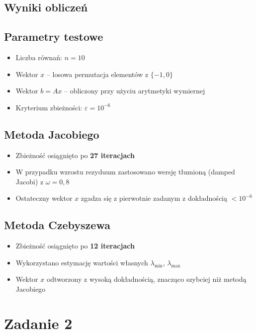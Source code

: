 \documentclass[a4paper,12pt]{article}
\begin{document}
\newpage
\subsection*{Wyniki obliczeń}

\subsection*{Parametry testowe}
\begin{itemize}
  \item Liczba równań: \( n = 10 \)
  \item Wektor \( x \) – losowa permutacja elementów z \( \{-1, 0\} \)
  \item Wektor \( b = A x \) – obliczony przy użyciu arytmetyki wymiernej
  \item Kryterium zbieżności: \( \varepsilon = 10^{-6} \)
\end{itemize}

\subsection*{Metoda Jacobiego}
\begin{itemize}
  \item Zbieżność osiągnięto po \textbf{27 iteracjach}
  \item W przypadku wzrostu rezyduum zastosowano wersję tłumioną (damped Jacobi) z \( \omega = 0{,}8 \)
  \item Ostateczny wektor \( x \) zgadza się z pierwotnie zadanym z dokładnością \( < 10^{-6} \)
\end{itemize}

\subsection*{Metoda Czebyszewa}
\begin{itemize}
  \item Zbieżność osiągnięto po \textbf{12 iteracjach}
  \item Wykorzystano estymację wartości własnych \( \lambda_{\min} \), \( \lambda_{\max} \)
  \item Wektor \( x \) odtworzony z wysoką dokładnością, znacząco szybciej niż metodą Jacobiego
\end{itemize}


\newpage
\section*{Zadanie 2}
\end{document}

